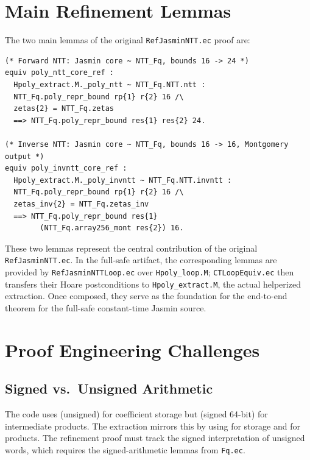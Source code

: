 \section{Main Refinement Lemmas}

The two main lemmas of the original \texttt{RefJasminNTT.ec} proof are:

\begin{lstlisting}[language=EasyCrypt,
  caption={Main refinement lemmas in \texttt{RefJasminNTT.ec}},
  label={lst:ref_lemmas}]
(* Forward NTT: Jasmin core ~ NTT_Fq, bounds 16 -> 24 *)
equiv poly_ntt_core_ref :
  Hpoly_extract.M._poly_ntt ~ NTT_Fq.NTT.ntt :
  NTT_Fq.poly_repr_bound rp{1} r{2} 16 /\
  zetas{2} = NTT_Fq.zetas
  ==> NTT_Fq.poly_repr_bound res{1} res{2} 24.

(* Inverse NTT: Jasmin core ~ NTT_Fq, bounds 16 -> 16, Montgomery output *)
equiv poly_invntt_core_ref :
  Hpoly_extract.M._poly_invntt ~ NTT_Fq.NTT.invntt :
  NTT_Fq.poly_repr_bound rp{1} r{2} 16 /\
  zetas_inv{2} = NTT_Fq.zetas_inv
  ==> NTT_Fq.poly_repr_bound res{1}
        (NTT_Fq.array256_mont res{2}) 16.
\end{lstlisting}

These two lemmas represent the central contribution of the original
\texttt{RefJasminNTT.ec}.  In the full-safe artifact, the corresponding
lemmas are provided by \texttt{RefJasminNTT\allowbreak Loop.ec} over
\texttt{Hpoly\_loop.M}; \texttt{CTLoopEquiv.ec} then transfers their Hoare
postconditions to \texttt{Hpoly\_extract.M}, the actual helperized extraction.
Once composed, they serve as the foundation for the end-to-end theorem for the
full-safe constant-time Jasmin source.

\section{Proof Engineering Challenges}

\subsection{Signed vs.\ Unsigned Arithmetic}

The \jasmin{} code uses  (unsigned) for coefficient storage but
 (signed 64-bit) for intermediate products.  The
\easycrypt{} extraction mirrors this by using \ec{W32.t} for storage and
\ec{W64.t} for products.  The refinement proof must track the signed
interpretation of unsigned words, which requires the signed-arithmetic
lemmas from \texttt{Fq.ec}.

